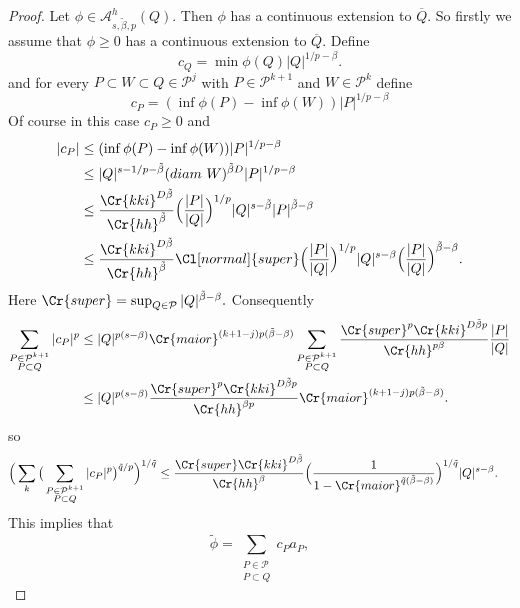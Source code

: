 \documentclass{amsart}
\theoremstyle{definition}
\newcommand{\Cll}[2][normal]{\Cl[#1]{#2}}
\newcommand{\Crr}[1]{\Cr{#1}}
\begin{document}
\begin{proof} Let $\phi \in \mathcal{A}^{h}_{s,\tilde{\beta},p}(Q)$.  Then $\phi$ has a continuous extension to $\overline{Q}$.  So firstly we  assume that    $\phi\geq 0$ has a continuous extension to $\overline{Q}$. Define 
$$c_Q= \min \phi(Q) |Q|^{1/p-\beta}.$$
and for every  $P\subset W\subset Q \in \mathcal{P}^j$ with $P \in \mathcal{P}^{k+1}$ and $W \in \mathcal{P}^{k}$ define
\begin{equation} \label{cv} c_P= (\inf \phi (P) -\inf \phi (W))|P|^{1/p-\beta}\end{equation}
Of course in this case $c_P\geq 0$ and
\begin{align*} |c_P| &\leq (\inf \phi (P) -\inf \phi (W))|P|^{1/p-\beta} \\
&\leq  |Q|^{s-1/p-\tilde{\beta}}  (diam \ W )^{\tilde{\beta}D} |P|^{1/p-\beta}\\
& \leq \frac{\Crr{kki}^{D\tilde{\beta}}}{\Crr{hh}^{\tilde{\beta}}}\Big( \frac{|P|}{|Q|}\Big)^{1/p} |Q|^{s-\tilde{\beta}} |P|^{\tilde{\beta}-\beta}\\
& \leq \frac{\Crr{kki}^{D\tilde{\beta}}}{\Crr{hh}^{\tilde{\beta}}} \Cll{super}  \Big( \frac{|P|}{|Q|}\Big)^{1/p} |Q|^{s-\beta} \Big(\frac{|P|}{|Q|}\Big)^{\tilde{\beta}-\beta}.
\end{align*}
Here $\Crr{super}= \sup_{Q\in \mathcal{P}}|Q|^{\tilde{\beta}-\beta}.$
Consequently 
\begin{align}\label{adapt} \sum_{\substack{P\in \mathcal{P}^{k+1}\\ P\subset Q}} |c_P|^p   & \leq  |Q|^{p(s-\beta)}   \Crr{maior}^{(k+1-j)p(\tilde{\beta}-\beta)} \sum_{\substack{P\in \mathcal{P}^{k+1}\\ P\subset Q}} \frac{ \Crr{super}^p\Crr{kki}^{D\tilde{\beta}p}}{\Crr{hh}^{p \beta}} \frac{|P|}{|Q|} \nonumber \\
&\leq |Q|^{p(s-\beta)} \frac{ \Crr{super}^p \Crr{kki}^{D\tilde{\beta}p}}{\Crr{hh}^{\beta p}} \Crr{maior}^{(k+1-j)p(\tilde{\beta}-\beta)}.\end{align}
so
\begin{align*}\Big(  \sum_k \big( \sum_{\substack{P\in \mathcal{P}^{k+1}\\ P\subset Q}} |c_P|^p\big)^{\tilde{q}/p} \Big)^{1/{\tilde{q}}}  &\leq  \frac{ \Crr{super}\Crr{kki}^{D\tilde{\beta}}}{\Crr{hh}^\beta} \Big(\frac{1}{1-\Crr{maior}^{\tilde{q} (\tilde{\beta}-\beta) }}\Big)^{1/\tilde{q}}  |Q|^{s-\beta}.\end{align*}
This implies that 
$$\tilde{\phi}=\sum_{\substack{ P\in \mathcal{P}\\ P\subset Q}} c_P a_P, $$

\end{proof}
\end{document}
